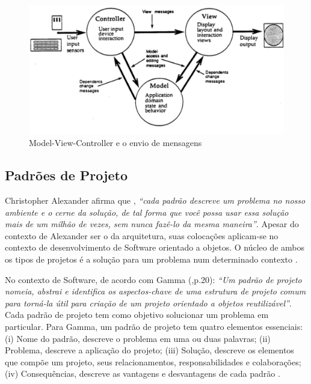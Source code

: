 \begin{figure}[h]
\centering
\label{f06}
\includegraphics[width=1\textwidth]{figuras/f06}
\caption{Model-View-Controller e o envio de mensagens}

\end{figure}



\subsection{Padrões de Projeto}

Christopher Alexander afirma que , \textit{“cada padrão descreve um problema no nosso ambiente e o cerne da solução, de tal forma que você possa usar essa solução mais de um milhão de vezes, sem nunca fazê-lo da mesma maneira”}. Apesar do contexto de Alexander ser o da arquitetura, suas colocações aplicam-se no contexto de desenvolvimento de Software orientado a objetos. O núcleo de ambos os tipos de projetos é a solução para um problema num determinado contexto \cite[p.19]{gamma2000}.

No contexto de Software, de acordo com Gamma (\citeyear{gamma2000},p.20): \textit{“Um padrão de projeto nomeia, abstrai e identifica os aspectos-chave de uma estrutura de projeto comum para torná-la útil para criação de um projeto orientado a objetos reutilizável”}. Cada padrão de projeto tem como objetivo solucionar um problema em particular. Para Gamma, um padrão de projeto tem quatro elementos essenciais: (i) Nome do padrão, descreve o problema em uma ou duas palavras; (ii) Problema, descreve a aplicação do projeto; (iii) Solução, descreve os elementos que compõe um projeto, seus relacionamentos, responsabilidades e colaborações; (iv) Consequências, descreve as vantagens e desvantagens de cada padrão \cite[p.19]{gamma2000}.

